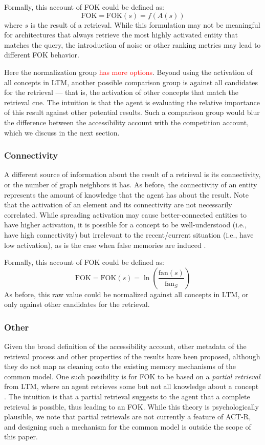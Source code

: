 \documentclass[10pt,letterpaper]{article}
\newcommand{\fixme}[2][]{#2}
\renewcommand{\fixme}[2][]{\textcolor{red}{#2}}
\newcommand{\fok}[0]{\text{FOK}}
\begin{document}
Formally, this account of FOK could be defined as:
$$\fok = \fok(s) = f(A(s))$$
where $s$ is the result of a retrieval.
While this formulation may not be meaningful for architectures that always retrieve the most highly activated entity that matches the query, the introduction of noise or other ranking metrics may lead to different FOK behavior.

Here the normalization group \fixme{has more options}.
Beyond using the activation of all concepts in LTM, another possible comparison group is against all candidates for the retrieval --- that is, the activation of other concepts that match the retrieval cue.
The intuition is that the agent is evaluating the relative importance of this result against other potential results.
Such a comparison group would blur the difference between the accessibility account with the competition account, which we discuss in the next section.

\subsubsection{Connectivity}

A different source of information about the result of a retrieval is its connectivity, or the number of graph neighbors it has.
As before, the connectivity of an entity represents the amount of knowledge that the agent has about the result.
Note that the activation of an element and its connectivity are not necessarily correlated.
While spreading activation may cause better-connected entities to have higher activation, it is possible for a concept to be well-understood (i.e., have high connectivity) but irrelevant to the recent/current situation (i.e., have low activation), as is the case when false memories are induced \cite{Li2016TowardsModelingFalse}.

Formally, this account of FOK could be defined as:
$$\fok = \fok(s) = \ln(\frac{\text{fan}(s)}{\overline{\text{fan}}_S})$$
As before, this raw value could be normalized against all concepts in LTM, or only against other candidates for the retrieval.

\subsubsection{Other} %

Given the broad definition of the accessibility account, other metadata of the retrieval process and other properties of the results have been proposed, although they do not map as cleaning onto the existing memory mechanisms of the common model.
One such possibility is for FOK to be based on a \textit{partial retrieval} from LTM, where an agent retrieves some but not all knowledge about a concept \cite{Hanczakowski2017MetamemoryInA}.
The intuition is that a partial retrieval suggests to the agent that a complete retrieval is possible, thus leading to an FOK.
While this theory is psychologically plausible, we note that partial retrievals are not currently a feature of ACT-R, and designing such a mechanism for the common model is outside the scope of this paper.
\end{document}
